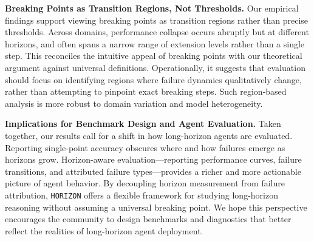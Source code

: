 \documentclass[11pt]{article}
\begin{document}
\textbf{Breaking Points as Transition Regions, Not Thresholds.}
Our empirical findings support viewing breaking points as transition regions rather than precise thresholds. Across domains, performance collapse occurs abruptly but at different horizons, and often spans a narrow range of extension levels rather than a single step. This reconciles the intuitive appeal of breaking points with our theoretical argument against universal definitions. Operationally, it suggests that evaluation should focus on identifying regions where failure dynamics qualitatively change, rather than attempting to pinpoint exact breaking steps. Such region-based analysis is more robust to domain variation and model heterogeneity.

\textbf{Implications for Benchmark Design and Agent Evaluation.}
Taken together, our results call for a shift in how long-horizon agents are evaluated. Reporting single-point accuracy obscures where and how failures emerge as horizons grow. Horizon-aware evaluation—reporting performance curves, failure transitions, and attributed failure types—provides a richer and more actionable picture of agent behavior. By decoupling horizon measurement from failure attribution, \texttt{HORIZON} offers a flexible framework for studying long-horizon reasoning without assuming a universal breaking point. We hope this perspective encourages the community to design benchmarks and diagnostics that better reflect the realities of long-horizon agent deployment.
\end{document}
